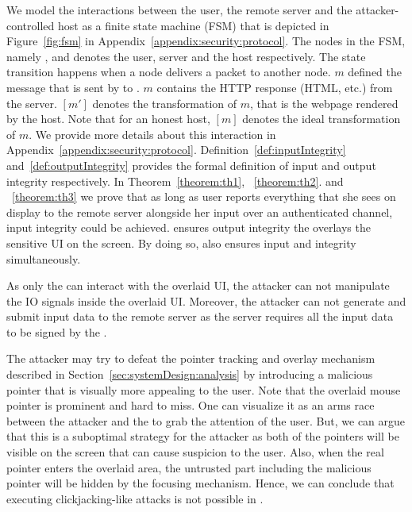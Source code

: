   We model the interactions between the user, the remote server and the attacker-controlled host as a finite state machine (FSM) that is depicted in Figure~\ref{fig:fsm} in Appendix~\ref{appendix:security:protocol}. The nodes in the FSM, namely \user, \server and \host denotes the user, server and the host respectively. The state transition happens when a node delivers a packet to another node. $m$ defined the message that is sent by \server to \host. $m$ contains the HTTP response (HTML, \js etc.) from the server. $[m']$ denotes the transformation of $m$, that is the webpage rendered by the host. Note that for an honest host, $[m]$ denotes the ideal transformation of $m$. We provide more details about this interaction in Appendix~\ref{appendix:security:protocol}.
Definition~\ref{def:inputIntegrity} and~\ref{def:outputIntegrity} provides the formal definition of input and output integrity respectively. In Theorem~\ref{theorem:th1}, ~\ref{theorem:th2}. and ~\ref{theorem:th3} we prove that as long as user reports everything that she sees on display to the remote server alongside her input over an authenticated channel, input integrity could be achieved. \name ensures output integrity the \device overlays the sensitive UI on the screen. By doing so, \name also ensures input and integrity simultaneously. 

 As only the \device can interact with the overlaid UI, the attacker can not manipulate the IO signals inside the overlaid UI. Moreover, the attacker can not generate and submit input data to the remote server as the server requires all the input data to be signed by the \device.

The attacker may try to defeat the \name pointer tracking and overlay mechanism described in Section~\ref{sec:systemDesign:analysis} by introducing a malicious pointer that is visually more appealing to the user. Note that the \device overlaid mouse pointer is prominent and hard to miss. One can visualize it as an arms race between the attacker and the \device to grab the attention of the user. But, we can argue that this is a suboptimal strategy for the attacker as both of the pointers will be visible on the screen that can cause suspicion to the user. Also, when the real pointer enters the overlaid area, the untrusted part including the malicious pointer will be hidden by the focusing mechanism. Hence, we can conclude that executing clickjacking-like attacks is not possible in \name.

